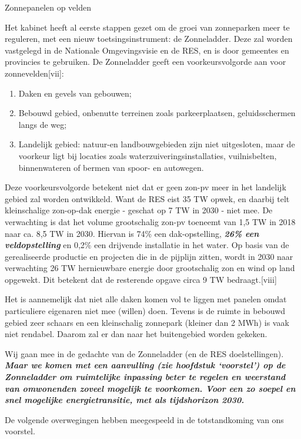 \begin{voorstel}{Zonnepanelen op velden}
\begin{uitdaging}
Het kabinet heeft al eerste stappen gezet om de groei van zonneparken meer te reguleren, met een nieuw toetsingsinstrument: de Zonneladder. Deze zal worden vastgelegd in de Nationale Omgevingsvisie en de RES, en is door gemeentes en provincies te gebruiken. De Zonneladder geeft een voorkeursvolgorde aan voor zonnevelden[vii]:
\begin{enumerate}
	\item Daken en gevels van gebouwen;
	\item Bebouwd gebied, onbenutte terreinen zoals parkeerplaatsen, geluidsschermen langs de weg;
	\item Landelijk gebied: natuur-en landbouwgebieden zijn niet uitgesloten, maar de voorkeur ligt bij locaties zoals waterzuiveringsinstallaties, vuilnisbelten, binnenwateren of bermen van spoor- en autowegen.
\end{enumerate}

Deze voorkeursvolgorde betekent niet dat er geen zon-pv meer in het landelijk gebied zal worden ontwikkeld. Want de RES eist 35 TW opwek, en daarbij telt kleinschalige zon-op-dak energie - geschat op 7 TW in 2030 -  niet mee. De verwachting is dat het volume grootschalig zon-pv toeneemt van 1,5 TW in 2018 naar ca. 8,5 TW in 2030. Hiervan is 74\% een dak-opstelling, \textbf{\em{26\% een veldopstelling}} en 0,2\% een drijvende installatie in het water. Op basis van de gerealiseerde productie en projecten die in de pijplijn zitten, wordt in 2030 naar verwachting 26 TW hernieuwbare energie door grootschalig zon en wind op land opgewekt. Dit betekent dat de resterende opgave circa 9 TW bedraagt.[viii]

Het is aannemelijk dat niet alle daken komen vol te liggen met panelen omdat particuliere eigenaren niet mee (willen) doen. Tevens is de ruimte in bebouwd gebied zeer schaars en een kleinschalig zonnepark (kleiner dan 2 MWh) is vaak niet rendabel. Daarom zal er dan naar het buitengebied worden gekeken.

Wij gaan mee in de gedachte van de Zonneladder (en de RES doelstellingen). \textbf{\em{Maar we komen met een aanvulling (zie hoofdstuk ‘voorstel’) op de Zonneladder om ruimtelijke inpassing beter te regelen en weerstand van omwonenden zoveel mogelijk te voorkomen. Voor een zo soepel en snel mogelijke energietransitie, met als tijdshorizon 2030.}}
\end{uitdaging}

\begin{overwegingen}
De volgende overwegingen hebben meegespeeld in de totstandkoming van ons voorstel.


\end{overwegingen}
\end{voorstel}
